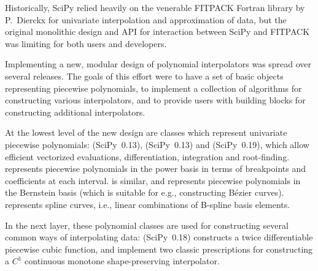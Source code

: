 Historically, SciPy relied heavily on the venerable FITPACK
Fortran library by P.~Dierckx \cite{Dierckx:1993:CSF:151103, FITPACK} for
univariate interpolation and approximation of data, but the original monolithic
design and API for interaction between SciPy and FITPACK was limiting for both
users and developers.

Implementing a new, modular design of polynomial interpolators was spread over
several releases. The goals of this effort were to have a set of basic objects
representing piecewise polynomials, to implement a collection of algorithms
for constructing various interpolators, and to provide users with building
blocks for constructing additional interpolators.

At the lowest level of the new design are classes which represent univariate
piecewise polynomials:  (SciPy~0.13)\cite{scipy-gh2885},
 (SciPy~0.13) and  (SciPy~0.19)\cite{scipy-gh3174},
which allow
efficient vectorized evaluations, differentiation, integration and root-finding.
 represents piecewise polynomials in the power basis in terms of
breakpoints and coefficients at each interval.  is similar, and
represents piecewise polynomials in the Bernstein basis (which is suitable
for e.g., constructing B\'{e}zier curves).  represents spline
curves, i.e., linear combinations of B-spline basis elements.\cite{deBoor1978}

In the next layer, these polynomial classes are used for constructing several
common ways of interpolating data:  (SciPy~0.18)
\cite{scipy-gh5653} constructs a twice
differentiable piecewise cubic function, 
and  implement two classic prescriptions for
constructing a $C^1$ continuous monotone shape-preserving interpolator.
\cite{FritschCarlson1980, Akima1970}

